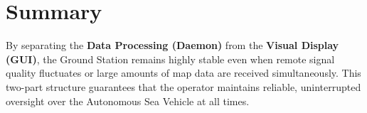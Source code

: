 \documentclass[12pt,a4paper]{article}
\begin{document}
\section{Summary}
By separating the \textbf{Data Processing (Daemon)} from the \textbf{Visual Display (GUI)}, the Ground Station remains highly stable even when remote signal quality fluctuates or large amounts of map data are received simultaneously. This two-part structure guarantees that the operator maintains reliable, uninterrupted oversight over the Autonomous Sea Vehicle at all times.
\end{document}
